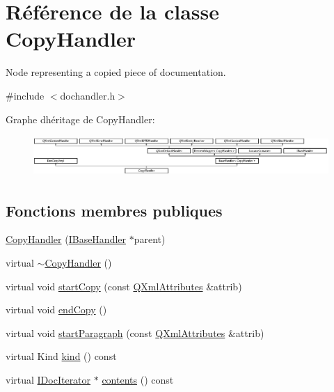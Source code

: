 \hypertarget{class_copy_handler}{}\section{Référence de la classe Copy\+Handler}
\label{class_copy_handler}


Node representing a copied piece of documentation.  




{\ttfamily \#include $<$dochandler.\+h$>$}

Graphe d\textquotesingle{}héritage de Copy\+Handler\+:\begin{figure}[H]
\begin{center}
\leavevmode
\includegraphics[height=1.545894cm]{class_copy_handler}
\end{center}
\end{figure}
\subsection*{Fonctions membres publiques}
\begin{DoxyCompactItemize}
\item 
\hyperlink{class_copy_handler_ac31db342ed4dedf97dd9cd71b318906a}{Copy\+Handler} (\hyperlink{class_i_base_handler}{I\+Base\+Handler} $\ast$parent)
\item 
virtual \hyperlink{class_copy_handler_a1ade2a15ff738bbccbe4dce07cc9703b}{$\sim$\+Copy\+Handler} ()
\item 
virtual void \hyperlink{class_copy_handler_a6e0e7a8dd643335e4d66ec9e5f5c19be}{start\+Copy} (const \hyperlink{class_q_xml_attributes}{Q\+Xml\+Attributes} \&attrib)
\item 
virtual void \hyperlink{class_copy_handler_ace7c864507bf32eb553aa4cc5bd5082c}{end\+Copy} ()
\item 
virtual void \hyperlink{class_copy_handler_aaf9e562cc23df7b989ac4dbd09e8201b}{start\+Paragraph} (const \hyperlink{class_q_xml_attributes}{Q\+Xml\+Attributes} \&attrib)
\item 
virtual Kind \hyperlink{class_copy_handler_a08490f29ea323238840d85a32b115615}{kind} () const 
\item 
virtual \hyperlink{class_i_doc_iterator}{I\+Doc\+Iterator} $\ast$ \hyperlink{class_copy_handler_a756ed55148e9dcb0f758d0d3a9bc4cf9}{contents} () const 
\end{DoxyCompactItemize}
